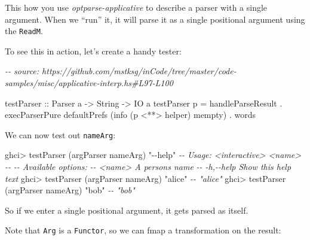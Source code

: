\documentclass[]{article}
\newenvironment{Shaded}{}{}
\newcommand{\CommentTok}[1]{\textcolor[rgb]{0.38,0.63,0.69}{\textit{#1}}}
\newcommand{\DataTypeTok}[1]{\textcolor[rgb]{0.56,0.13,0.00}{#1}}
\newcommand{\FunctionTok}[1]{\textcolor[rgb]{0.02,0.16,0.49}{#1}}
\newcommand{\NormalTok}[1]{#1}
\newcommand{\OperatorTok}[1]{\textcolor[rgb]{0.40,0.40,0.40}{#1}}
\newcommand{\OtherTok}[1]{\textcolor[rgb]{0.00,0.44,0.13}{#1}}
\newcommand{\StringTok}[1]{\textcolor[rgb]{0.25,0.44,0.63}{#1}}
\begin{document}
This how you use \emph{optparse-applicative} to describe a parser with a single
argument. When we ``run'' it, it will parse it as a single positional argument
using the \texttt{ReadM}.

To see this in action, let's create a handy tester:

\begin{Shaded}
\begin{Highlighting}[]
\CommentTok{{-}{-} source: https://github.com/mstksg/inCode/tree/master/code{-}samples/misc/applicative{-}interp.hs\#L97{-}L100}

\OtherTok{testParser ::} \DataTypeTok{Parser}\NormalTok{ a }\OtherTok{{-}\textgreater{}} \DataTypeTok{String} \OtherTok{{-}\textgreater{}} \DataTypeTok{IO}\NormalTok{ a}
\NormalTok{testParser p }\OtherTok{=}\NormalTok{ handleParseResult}
             \OperatorTok{.}\NormalTok{ execParserPure defaultPrefs (info (p }\OperatorTok{\textless{}**\textgreater{}}\NormalTok{ helper) }\FunctionTok{mempty}\NormalTok{)}
             \OperatorTok{.} \FunctionTok{words}
\end{Highlighting}
\end{Shaded}

We can now test out \texttt{nameArg}:

\begin{Shaded}
\begin{Highlighting}[]
\NormalTok{ghci}\OperatorTok{\textgreater{}}\NormalTok{ testParser (argParser nameArg) }\StringTok{"{-}{-}help"}
\CommentTok{{-}{-} Usage: \textless{}interactive\textgreater{} \textless{}name\textgreater{}}
\CommentTok{{-}{-}}
\CommentTok{{-}{-} Available options:}
\CommentTok{{-}{-}   \textless{}name\textgreater{}                   A person\textquotesingle{}s name}
\CommentTok{{-}{-}   {-}h,{-}{-}help                Show this help text}
\NormalTok{ghci}\OperatorTok{\textgreater{}}\NormalTok{ testParser (argParser nameArg) }\StringTok{"alice"}
\CommentTok{{-}{-} "alice"}
\NormalTok{ghci}\OperatorTok{\textgreater{}}\NormalTok{ testParser (argParser nameArg) }\StringTok{"bob"}
\CommentTok{{-}{-} "bob"}
\end{Highlighting}
\end{Shaded}

So if we enter a single positional argument, it gets parsed as itself.

Note that \texttt{Arg} is a \texttt{Functor}, so we can fmap a transformation on
the result:

\begin{Shaded}
\end{Shaded}
\end{document}
